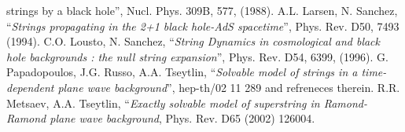 \documentclass[12pt,a4paper]{article}
\begin{document}
\begin{thebibliography}{10}
{strings by a black hole}'', Nucl. Phys. 309B, 577, (1988).
 A.L. Larsen, N. Sanchez, ``{\it Strings propagating in 
the 2+1 black hole-AdS spacetime}'', Phys. Rev. D50, 7493 (1994). 
 C.O. Lousto, N. Sanchez, ``{\it String Dynamics in 
cosmological   and black hole backgrounds : the null string expansion}'', 
Phys. Rev. D54, 6399, (1996).
 G. Papadopoulos, J.G. Russo, A.A. Tseytlin, ``{\it Solvable model of strings in a time-dependent plane wave background}'', hep-th/02 11 289 and refreneces therein.   
 R.R. Metsaev, A.A. Tseytlin, ``{\it Exactly solvable model of superstring in Ramond-Ramond plane wave background}, Phys. 
Rev. D65 (2002) 126004.
\end{thebibliography}         

 
\end{document}
